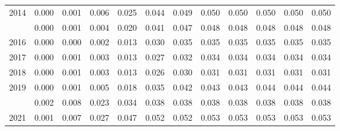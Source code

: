\documentclass[
]{article}
\begin{document}
\begin{longtable}[t]{lrrrrrrrrrrr}
2014 & 0.000 & 0.001 & 0.006 & 0.025 & 0.044 & 0.049 & 0.050 & 0.050 & 0.050 & 0.050 & 0.050\\
\addlinespace
2015 & 0.000 & 0.001 & 0.004 & 0.020 & 0.041 & 0.047 & 0.048 & 0.048 & 0.048 & 0.048 & 0.048\\
2016 & 0.000 & 0.000 & 0.002 & 0.013 & 0.030 & 0.035 & 0.035 & 0.035 & 0.035 & 0.035 & 0.035\\
2017 & 0.000 & 0.001 & 0.003 & 0.013 & 0.027 & 0.032 & 0.034 & 0.034 & 0.034 & 0.034 & 0.034\\
2018 & 0.000 & 0.001 & 0.003 & 0.013 & 0.026 & 0.030 & 0.031 & 0.031 & 0.031 & 0.031 & 0.031\\
2019 & 0.000 & 0.001 & 0.005 & 0.018 & 0.035 & 0.042 & 0.043 & 0.043 & 0.044 & 0.044 & 0.044\\
\addlinespace
2020 & 0.002 & 0.008 & 0.023 & 0.034 & 0.038 & 0.038 & 0.038 & 0.038 & 0.038 & 0.038 & 0.038\\
2021 & 0.001 & 0.007 & 0.027 & 0.047 & 0.052 & 0.052 & 0.053 & 0.053 & 0.053 & 0.053 & 0.053\\*
\end{longtable}
\end{document}

